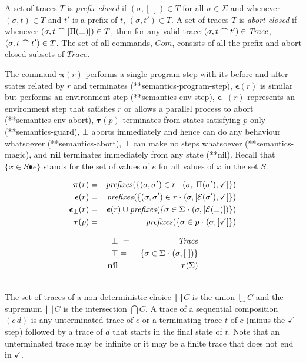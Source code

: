 \documentclass[fleqn]{fac}
\makeatletter
\newcommand{\labelproperty}[1]{\label{property-#1}\index{Property!#1|PropertyDef{\ref{property-#1}}}}
\def\refproperty{\@ifnextchar*{\@refproperty}{\@@refproperty}}
\def\@refproperty*#1{\ref{property-#1}\index{Property!#1|LawUse}}
\def\@@refproperty#1{property~(\ref{property-#1})\index{Property!#1|LawUse}}
\newcommand{\SSeq}{\,}
\newcommand{\cat}{\mathbin{\raise 0.8ex\hbox{$\frown$}}}
\newcommand{\Nil}{\Keyword{nil}}
\newcommand{\Command}{\mathit{Com}}
\newcommand{\Nondet}{\mathop{\textstyle\bigsqcap}}
\newcommand{\Angelic}{\mathop{\textstyle\bigsqcup}}
\newcommand{\PrefixClose}[1]{\mathit{prefixes}(#1)}
\newcommand{\Trace}{\mathit{Trace}}
\newcommand{\Keyword}[1]{\mathsf{\mathbf{#1}}}
\newcommand{\Magic}{\Keyword{\top}}
\newcommand{\Abort}{\Keyword{\bot}}
\newcommand{\botstate}{\bot}
\newcommand{\pstepl}[1]{\Pi(#1)}
\newcommand{\estepl}[1]{{\cal E}(#1)}
\newcommand{\termd}{\checkmark}
\newcommand{\cpstepd}{\boldsymbol{\pi}}
\newcommand{\cestepd}{\boldsymbol{\epsilon}}
\newcommand{\cestepbotd}{\cestepd_{\botstate}}
\newcommand{\cpstep}[1]{\cpstepd(#1)}
\newcommand{\cestep}[1]{\cestepd(#1)}
\newcommand{\cestepbot}[1]{\cestepbotd(#1)}
\newcommand{\cgdd}{\boldsymbol{\tau}}
\newcommand{\cgd}[1]{\cgdd(#1)}
\makeatother
\begin{document}
A set of traces $T$ is \emph{prefix closed} if $(\sigma, [~]) \in T$ for all $\sigma \in \Sigma$
and whenever $(\sigma,t) \in T$ and $t'$ is a prefix of $t$, $(\sigma,t') \in T$.
A set of traces $T$ is \emph{abort closed} if whenever $(\sigma,t \cat [\pstepl{\botstate}]) \in T$,
then for any valid trace $(\sigma, t \cat t') \in \Trace$, $(\sigma, t \cat t') \in T$.
The set of all commands, $\Command$, consists of all the prefix and abort closed subsets of $\Trace$. 

The command
$\cpstep{r}$ performs a single program step with its before and after states related by $r$ and terminates (\refproperty*{semantics-program-step}),
$\cestep{r}$ is similar but performs an environment step (\refproperty*{semantics-env-step}),
$\cestepbot{r}$ represents an environment step that satisfies $r$ or allows a parallel process to abort (\refproperty*{semantics-env-abort}),
$\cgd{p}$ terminates from states satisfying $p$ only (\refproperty*{semantics-guard}),
$\Abort$ aborts immediately and hence can do any behaviour whatsoever (\refproperty*{semantics-abort}),
$\Magic$ can make no steps whatsoever (\refproperty*{semantics-magic}),
and
$\Nil$ terminates immediately from any state (\refproperty*{nil}).
Recall that $\{ x \in S \spot e \}$ stands for the set of values of $e$ for all values of $x$ in the set $S$.\\
\begin{minipage}{0.55\textwidth}
\begin{eqnarray}
  \cpstep{r} & = & \PrefixClose{ \{ (\sigma,\sigma') \in r \spot (\sigma,[\pstepl{\sigma'},\termd] \} }    \labelproperty{semantics-program-step} \\
  \cestep{r} & = & \PrefixClose{ \{ (\sigma,\sigma') \in r \spot (\sigma,[\estepl{\sigma'},\termd] \} }    \labelproperty{semantics-env-step} \\
  \cestepbot{r} & = & \cestep{r} \cup \PrefixClose{ \{ \sigma \in \Sigma \spot (\sigma, [\estepl{\botstate}]) \} } \labelproperty{semantics-env-abort} \\
  \cgd{p} & = & \PrefixClose{ \{ \sigma \in p \spot (\sigma,[\termd] \} }    \labelproperty{semantics-guard} 
\end{eqnarray}
\end{minipage}
\begin{minipage}{0.44\textwidth}
\begin{eqnarray}
  \Abort  & ~=~ & \Trace   \labelproperty{semantics-abort} \\
  \Magic & = & \{ \sigma \in \Sigma \spot (\sigma, [~])\}    \labelproperty{semantics-magic} \\
  \Nil & ~=~ & \cgd{\Sigma}   \labelproperty{nil}  
\end{eqnarray}
\end{minipage}
\\[1ex]
The set of traces of a non-deterministic choice $\Nondet C$ is the union 
$\bigcup C$ and the supremum $\Angelic C$ is the intersection $\bigcap C$.
A trace of a sequential composition $(c \SSeq d)$ is 
any unterminated trace of $c$
or
a terminating trace $t$ of $c$ (minus the $\termd$ step) followed by a trace of $d$
that starts in the final state of $t$.
Note that an unterminated trace may be infinite or it may be a finite trace that does not end in $\termd$.
\end{document}
